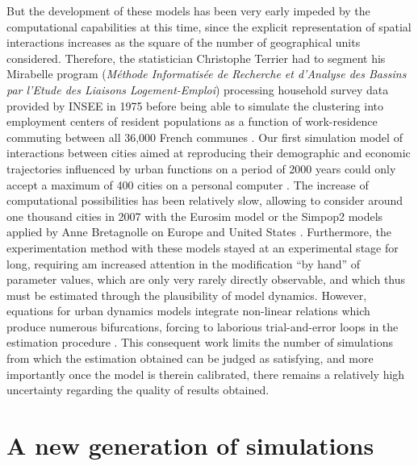 \documentclass[10pt]{article}
\begin{document}
But the development of these models has been very early impeded by the computational capabilities at this time, since the explicit representation of spatial interactions increases as the square of the number of geographical units considered. Therefore, the statistician Christophe Terrier had to segment his Mirabelle program (\textit{Méthode Informatisée de Recherche et d'Analyse des Bassins par l'Etude des Liaisons Logement-Emploi}) processing household survey data provided by INSEE in 1975 before being able to simulate the clustering into employment centers of resident populations as a function of work-residence commuting between all 36,000 French communes \citep{}. Our first simulation model of interactions between cities aimed at reproducing their demographic and economic trajectories influenced by urban functions on a period of 2000 years could only accept a maximum of 400 cities on a personal computer \citep{bura1996multiagent} \citep{}. The increase of computational possibilities has been relatively slow, allowing to consider around one thousand cities in 2007 with the Eurosim model \citep{} or the Simpop2 models applied by Anne Bretagnolle on Europe and United States \citep{bretagnolle2010simulating}. Furthermore, the experimentation method with these models stayed at an experimental stage for long, requiring am increased attention in the modification ``by hand'' of parameter values, which are only very rarely directly observable, and which thus must be estimated through the plausibility of model dynamics. However, equations for urban dynamics models integrate non-linear relations which produce numerous bifurcations, forcing to laborious trial-and-error loops in the estimation procedure \citep{}. This consequent work limits the number of simulations from which the estimation obtained can be judged as satisfying, and more importantly once the model is therein calibrated, there remains a relatively high uncertainty regarding the quality of results obtained.


\section{A new generation of simulations}
\end{document}
